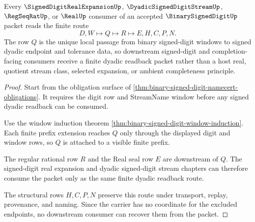 \begin{theorem}
\label{thm:binary-signed-digit-dyadic-readback}
Every $\SignedDigitRealExpansionUp$, $\DyadicSignedDigitStreamUp$, $\RegSeqRatUp$, or $\RealUp$ consumer of an accepted $\BinarySignedDigitUp$ packet reads the finite route
$$
D,W \longmapsto Q \longmapsto R \longmapsto E,H,C,P,N .
$$
The row $Q$ is the unique local passage from binary signed-digit windows to signed dyadic endpoint and tolerance data, so downstream signed-digit and completion-facing consumers receive a finite dyadic readback packet rather than a host real, quotient stream class, selected expansion, or ambient completeness principle.
\end{theorem}
\begin{proof}
Start from the obligation surface of \autoref{thm:binary-signed-digit-namecert-obligations}. It requires the digit row and StreamName window before any signed dyadic readback can be consumed.

Use the window induction theorem \autoref{thm:binary-signed-digit-window-induction}. Each finite prefix extension reaches $Q$ only through the displayed digit and window rows, so $Q$ is attached to a visible finite prefix.

The regular rational row $R$ and the Real seal row $E$ are downstream of $Q$. The signed-digit real expansion and dyadic signed-digit stream chapters can therefore consume the packet only as the same finite dyadic readback route.

The structural rows $H,C,P,N$ preserve this route under transport, replay, provenance, and naming. Since the carrier has no coordinate for the excluded endpoints, no downstream consumer can recover them from the packet.
\end{proof}


\begin{closurestatus}{\BinarySignedDigitUp}
  \theoryclosure{\seedClosure}
  \formalstatus{\unformalizedV}
\end{closurestatus}
